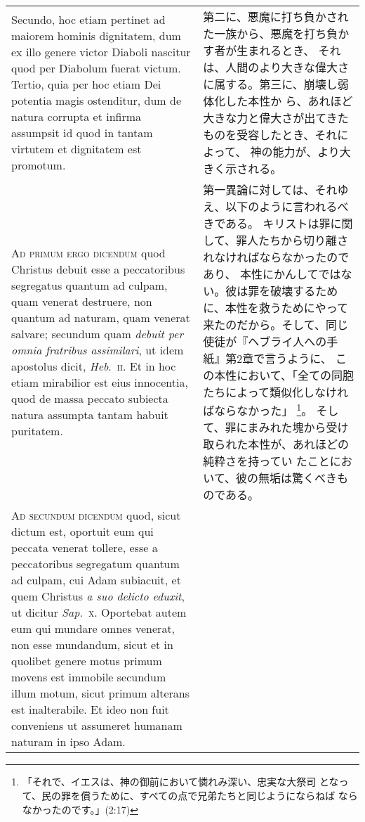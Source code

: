 \documentclass[10pt]{jsarticle} %
\begin{document}
\begin{longtable}{p{21em}p{21em}}
\\

Secundo, hoc etiam pertinet ad maiorem hominis
dignitatem, dum ex illo genere victor Diaboli nascitur quod per Diabolum
fuerat victum. Tertio, quia per hoc etiam Dei potentia magis ostenditur,
dum de natura corrupta et infirma assumpsit id quod in tantam virtutem
et dignitatem est promotum.


&

第二に、悪魔に打ち負かされた一族から、悪魔を打ち負かす者が生まれるとき、
 それは、人間のより大きな偉大さに属する。第三に、崩壊し弱体化した本性か
 ら、あれほど大きな力と偉大さが出てきたものを受容したとき、それによって、
 神の能力が、より大きく示される。

\\



{\scshape Ad primum ergo dicendum} quod Christus debuit esse a peccatoribus
segregatus quantum ad culpam, quam venerat destruere, non quantum ad
naturam, quam venerat salvare; secundum quam {\itshape debuit per omnia fratribus
assimilari}, ut idem apostolus dicit, {\itshape Heb}.~{\scshape ii}. Et in hoc etiam mirabilior
est eius innocentia, quod de massa peccato subiecta natura assumpta
tantam habuit puritatem.


&

第一異論に対しては、それゆえ、以下のように言われるべきである。
キリストは罪に関して、罪人たちから切り離されなければならなかったのであり、
 本性にかんしてではない。彼は罪を破壊するために、本性を救うためにやって
 来たのだから。そして、同じ使徒が『ヘブライ人への手紙』第2章で言うように、
 この本性において、「全ての同胞たちによって類似化しなければならなかった」
 \footnote{「それで、イエスは、神の御前において憐れみ深い、忠実な大祭司
 となって、民の罪を償うために、すべての点で兄弟たちと同じようにならねば
 ならなかったのです。」(2:17)}。
そして、罪にまみれた塊から受け取られた本性が、あれほどの純粋さを持ってい
 たことにおいて、彼の無垢は驚くべきものである。

\\



{\scshape Ad secundum dicendum} quod, sicut dictum est, oportuit eum qui peccata
venerat tollere, esse a peccatoribus segregatum quantum ad culpam, cui
Adam subiacuit, et quem Christus {\itshape a suo delicto eduxit}, ut dicitur
{\itshape Sap}.~{\scshape x}. Oportebat autem eum qui mundare omnes venerat, non esse
mundandum, sicut et in quolibet genere motus primum movens est immobile
secundum illum motum, sicut primum alterans est inalterabile. Et ideo
non fuit conveniens ut assumeret humanam naturam in ipso Adam.



\end{longtable}
\end{document}
